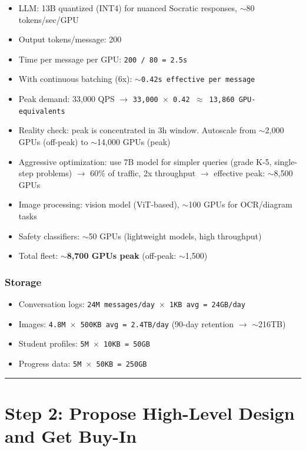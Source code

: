 \begin{itemize}
  \item LLM: 13B quantized (INT4) for nuanced Socratic responses, $\sim$80 tokens/sec/GPU
  \item Output tokens/message: 200
  \item Time per message per GPU: \texttt{200 / 80 = 2.5s}
  \item With continuous batching (6x): \texttt{$\sim$0.42s effective per message}
  \item Peak demand: 33,000 QPS $\rightarrow$ \texttt{33,000 $\times$ 0.42 $\approx$ 13,860 GPU-equivalents}
  \item Reality check: peak is concentrated in 3h window. Autoscale from $\sim$2,000 GPUs (off-peak) to $\sim$14,000 GPUs (peak)
  \item Aggressive optimization: use 7B model for simpler queries (grade K-5, single-step problems) $\rightarrow$ 60\% of traffic, 2x throughput $\rightarrow$ effective peak: $\sim$8,500 GPUs
  \item Image processing: vision model (ViT-based), $\sim$100 GPUs for OCR/diagram tasks
  \item Safety classifiers: $\sim$50 GPUs (lightweight models, high throughput)
  \item Total fleet: \textbf{$\sim$8,700 GPUs peak} (off-peak: $\sim$1,500)
\end{itemize}

\subsubsection*{Storage}

\begin{itemize}
  \item Conversation logs: \texttt{24M messages/day $\times$ 1KB avg = 24GB/day}
  \item Images: \texttt{4.8M $\times$ 500KB avg = 2.4TB/day} (90-day retention $\rightarrow$ $\sim$216TB)
  \item Student profiles: \texttt{5M $\times$ 10KB = 50GB}
  \item Progress data: \texttt{5M $\times$ 50KB = 250GB}
\end{itemize}

\bigskip\hrule\bigskip

\section*{Step 2: Propose High-Level Design and Get Buy-In}

